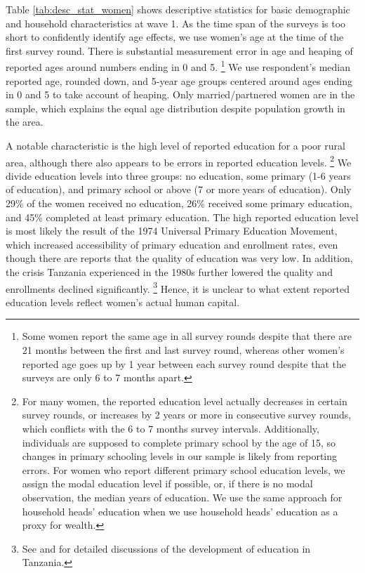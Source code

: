 \documentclass[letterpaper,12pt]{article}
\begin{document}
Table \ref{tab:desc_stat_women} shows descriptive statistics for basic
demographic and household characteristics at wave 1.
As the time span of the surveys is too short to confidently identify age effects,
we use women's age at the time of the first survey round.
There is substantial measurement error in age and heaping of reported ages 
around numbers ending in 0 and 5.%
\footnote{
Some women report the same age in all survey rounds despite that there are
21 months between the first and last survey round, whereas other women's reported 
age goes up by 1 year between each survey round despite that the surveys are only 
6 to 7 months apart.
}
We use respondent's median reported age, rounded down, and 5-year age groups 
centered around ages ending in 0 and 5 to take account of heaping.
Only married/partnered women are in the sample, which explains the 
equal age distribution despite population growth in the area.

A notable characteristic is the high level of reported education for a poor 
rural area, although there also appears to be errors in 
reported education levels.%
\footnote{
For many women, the reported education level actually decreases in certain survey 
rounds, or increases by 2 years or more in consecutive survey rounds, which 
conflicts with the 6 to 7 months survey intervals. 
Additionally, individuals are supposed to complete primary school by the age of 15,
so changes in primary schooling levels in our sample is likely from reporting 
errors. 
For women who report different primary school education levels, we 
assign the modal education level if possible, or, if there is no modal 
observation, the median years of education.
We use the same approach for household heads' education
when we use household heads' education as a proxy for wealth.
}
We divide education levels into three groups: no education, 
some primary (1-6 years of education), and primary school 
or above (7 or more years of education).
Only 29\% of the women received no education, 26\% received some 
primary education, and 45\% completed at least primary education.
The high reported education level is most likely the result of the 1974 
Universal Primary Education Movement,
which increased accessibility of primary education and enrollment rates, 
even though there are reports that the quality of education was very low.
In addition, the crisis Tanzania experienced in the 1980s further lowered the 
quality and enrollments declined significantly.%
\footnote{See \cite{Galabawa2001} and \cite{Wedgwood2005} for detailed discussions 
of the development of education in Tanzania.
}
Hence, it is unclear to what extent reported education levels reflect 
women's actual human capital.
\end{document}
